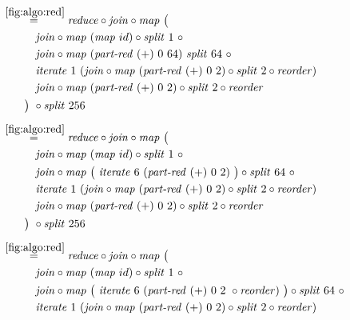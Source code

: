 \begin{align*}
%
  &\hspace{-2em}\quad\begin{aligned}
    &\overset{\ref{fig:algo:red}}{=\hspace{.2em}}
      \reduce \circ \join \circ \map\ \big(\\
    &\qquad\quad\join \circ \map\ (\map\ id) \circ \splitN\ 1\ \circ\\
    &\qquad\quad\join \circ \map\ (\partRed\ (+)\ 0\ 64)\ \splitN\ 64\ \circ\\
    &\qquad\quad\iterateN\ 1\ (\join \circ \map\ (\partRed\ (+)\ 0\ 2) \circ \splitN\ 2\circ \reorder)\\
    &\qquad\quad\join \circ \map\ (\partRed\ (+)\ 0\ 2) \circ \splitN\ 2\circ \reorder\\
    &\qquad\big)\ \circ \splitN\ 256
  \end{aligned}\\[.5em]
%
  &\hspace{-2em}\quad\begin{aligned}
    &\overset{\ref{fig:algo:red}}{=\hspace{.2em}}
      \reduce \circ \join \circ \map\ \big(\\
    &\qquad\quad\join \circ \map\ (\map\ id) \circ \splitN\ 1\ \circ\\
    &\qquad\quad\join \circ \map\ \big(\ \iterateN\ 6\ (\partRed\ (+)\ 0\ 2)\ \big)\circ \splitN\ 64\ \circ\\
    &\qquad\quad\iterateN\ 1\ (\join \circ \map\ (\partRed\ (+)\ 0\ 2) \circ \splitN\ 2\circ \reorder)\\
    &\qquad\quad\join \circ \map\ (\partRed\ (+)\ 0\ 2) \circ \splitN\ 2\circ \reorder\\
    &\qquad\big)\ \circ \splitN\ 256
  \end{aligned}\\[.5em]
%
  &\hspace{-2em}\quad\begin{aligned}
    &\overset{\ref{fig:algo:red}}{=\hspace{.2em}}
      \reduce \circ \join \circ \map\ \big(\\
    &\qquad\quad\join \circ \map\ (\map\ id) \circ \splitN\ 1\ \circ\\
    &\qquad\quad\join \circ \map\ \big(\ \iterateN\ 6\ (\partRed\ (+)\ 0\ 2\ \circ \reorder)\ \big)\circ \splitN\ 64\ \circ\\
    &\qquad\quad\iterateN\ 1\ (\join \circ \map\ (\partRed\ (+)\ 0\ 2) \circ \splitN\ 2\circ \reorder)\\

\end{aligned}
\end{align*}
